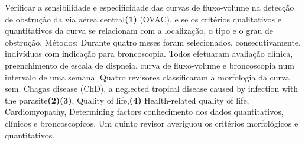 \documentclass[10pt,a4paper]{article}
\begin{document}
\printtitle 
\printauthor



                  \renewcommand{\xrefbibrstyle}{\color{out}\bfseries}
                  \renewcommand{\xrefbibr}[1]{{\xrefbibrstyle#1}}
            
                  Verificar a sensibilidade e especificidade das curvas de fluxo-volume na
                  detecção de obstrução da via aérea central\xrefbibr{(1)} (OVAC), e se os critérios
                  qualitativos e quantitativos da curva se relacionam com a localização, o
                  tipo e o grau de obstrução. Métodos: Durante quatro meses foram
                  selecionados, consecutivamente, indivíduos com indicação para
                  broncoscopia. Todos efetuaram avaliação clínica, preenchimento de escala
                  de dispneia, curva de fluxo-volume e broncoscopia num intervalo de uma
                  semana. Quatro revisores classificaram a morfologia da curva sem.      
                  Chagas disease (ChD), a neglected tropical disease caused by infection 
                   with the parasite\xrefbibr{(2)}\xrefbibr{(3)}, Quality of life,\xrefbibr{(4)} 
                  Health-related quality of life, Cardiomyopathy, Determining factors
                  conhecimento dos dados quantitativos, clínicos e broncoscopicos. Um
                  quinto revisor averiguou os critérios morfológicos e quantitativos.

%
\end{document}
